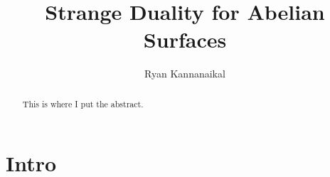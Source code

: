 \documentclass[11pt]{amsart}
\title{Strange Duality for Abelian Surfaces}
\author{Ryan Kannanaikal}
\begin{document}
    \begin{abstract}
    This is where I put the abstract.
    \end{abstract}
\maketitle
\tableofcontents

\section{Intro}

\clearpage
\printbibliography
\end{document}
